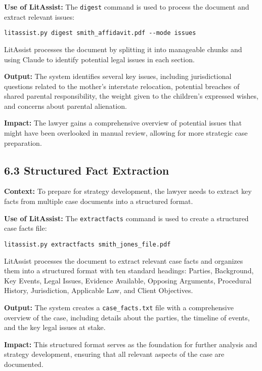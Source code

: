 \documentclass[12pt,a4paper]{article}
\begin{document}
\textbf{Use of LitAssist:} The \texttt{digest} command is used to process the document and extract relevant issues:

\begin{verbatim}
litassist.py digest smith_affidavit.pdf --mode issues
\end{verbatim}

LitAssist processes the document by splitting it into manageable chunks and using Claude to identify potential legal issues in each section.

\textbf{Output:} The system identifies several key issues, including jurisdictional questions related to the mother's interstate relocation, potential breaches of shared parental responsibility, the weight given to the children's expressed wishes, and concerns about parental alienation.

\textbf{Impact:} The lawyer gains a comprehensive overview of potential issues that might have been overlooked in manual review, allowing for more strategic case preparation.

\subsection*{6.3 Structured Fact Extraction}

\textbf{Context:} To prepare for strategy development, the lawyer needs to extract key facts from multiple case documents into a structured format.

\textbf{Use of LitAssist:} The \texttt{extractfacts} command is used to create a structured case facts file:

\begin{verbatim}
litassist.py extractfacts smith_jones_file.pdf
\end{verbatim}

LitAssist processes the document to extract relevant case facts and organizes them into a structured format with ten standard headings: Parties, Background, Key Events, Legal Issues, Evidence Available, Opposing Arguments, Procedural History, Jurisdiction, Applicable Law, and Client Objectives.

\textbf{Output:} The system creates a \texttt{case\_facts.txt} file with a comprehensive overview of the case, including details about the parties, the timeline of events, and the key legal issues at stake.

\textbf{Impact:} This structured format serves as the foundation for further analysis and strategy development, ensuring that all relevant aspects of the case are documented.
\end{document}
